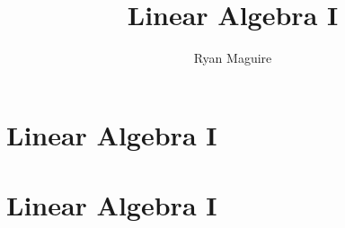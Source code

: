 \documentclass[crop=false,class=book,oneside]{standalone}
\begin{document}
    \ifx\ifmath\undefined
        \title{Linear Algebra I}
        \author{Ryan Maguire}
        \date{\vspace{-5ex}}
        \maketitle
        \tableofcontents
        \chapter*{Linear Algebra I}
        \setcounter{chapter}{1}
    \else
        \chapter{Linear Algebra I}
    \fi
\end{document}
